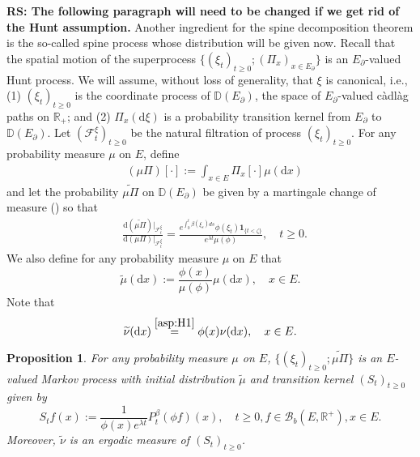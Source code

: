 \documentclass[12pt,a4paper]{amsart}
\numberwithin{equation}{section}
\theoremstyle{plain}
\newtheorem{prop}[thm]{Proposition}
\theoremstyle{definition}
\theoremstyle{remark}
\begin{document}
	{\bf RS: The following paragraph will need to be changed if we get rid of the Hunt assumption.}
	Another ingredient for the spine decomposition theorem is the so-called spine process whose distribution will be given now.
	Recall that the spatial motion of the superprocess $\{(\xi_t)_{t\geq 0}; (\Pi_x)_{x\in E_\partial}\}$ is an $E_\partial$-valued Hunt process.
	We will assume, without loss of generality, that $\xi$ is canonical,  i.e., (1) $(\xi_t)_{t\geq 0}$ is the coordinate process of
	$\mathbb D(E_\partial)$,
	the space of $E_\partial$-valued c\`adl\`ag paths on $\mathbb R_+$; and
	(2) $\Pi_x(\mathrm d\xi)$ is a probability transition kernel from $E_\partial$ to $\mathbb D(E_\partial)$.
	Let  $(\mathscr F_t^{\xi})_{t\geq 0}$ be the natural filtration of process $(\xi_t)_{t\geq 0}$.
	For any probability measure $\mu$ on $E$, define
\begin{align}
	& (\mu \Pi)[\cdot] :=
	\int_{x\in E} \Pi_x[\cdot]\mu(\mathrm dx)
\end{align}
and let the probability $\widetilde {\mu \Pi}$ on $\mathbb D(E_\partial)$ be given by a martingale change of measure (\cite[Lemma 18.18]{Kallenberg2002Foundations}) so that
\begin{align}
	&  \frac{\mathrm d (\widetilde{\mu \Pi})|_{\mathscr F^\xi_t}}{\mathrm d (\mu \Pi)|_{\mathscr F^\xi_t}}
	=\frac{e^{\int_0^t \beta(\xi_s)ds}\phi(\xi_t) \mathbf 1_{\{t<\zeta\}}}{e^{\lambda t}\mu(\phi)},
	\quad t\geq 0.
\end{align}
We also define for any probability measure $\mu$ on $E$ that
\begin{equation}
	\widetilde \mu(\mathrm dx)
	:= \frac{\phi(x)}{\mu(\phi)} \mu(\mathrm dx),
	\quad x\in E.
\end{equation}
Note that
\begin{equation} \label{eq:E.162}
	\widetilde \nu(\mathrm dx)
	\overset{\eqref{asp:H1}}= \phi(x) \nu(\mathrm dx),
	\quad x\in E.
\end{equation}

\begin{prop} \label{thm:E.15}
	For any probability measure $\mu$ on $E$, $\{(\xi_t)_{t\geq 0}; \widetilde{\mu \Pi}\}$ is an $E$-valued Markov process with initial distribution $\widetilde \mu$ and transition kernel $(S_t)_{t\geq 0}$ given by
\begin{equation} \label{eq:E.17}
	S_t f(x)
	:= \frac{1}{\phi(x)e^{\lambda t}}P_t^\beta (\phi f) (x),
	\quad t\geq 0, f\in \mathcal B_b(E,\mathbb R^+),x\in E.
\end{equation}
	 Moreover, $\widetilde \nu$ is an ergodic measure of $(S_t)_{t\geq 0}$.
\end{prop}
\end{document}
